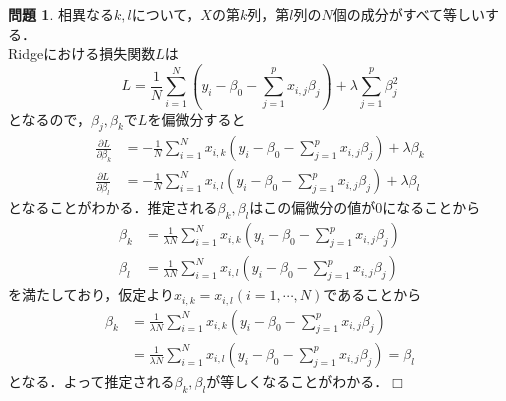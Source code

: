 \documentclass[titlepage]{jsarticle}
\theoremstyle{definition}
\newtheorem{Ex}{問題}
\theoremstyle{mystyle} %
\def\qed{\hfill$\Box$}
\begin{document}
\begin{Ex}
相異なる$k,l$について，$X$の第$k$列，第$l$列の$N$個の成分がすべて等しいする．\\
Ridgeにおける損失関数$L$は
$$L=\frac{1}{N}\sum_{i=1}^N(y_i-\beta_0-\sum_{j=1}^px_{i,j}\beta_j)+\lambda\sum_{j=1}^p \beta_j^2$$
となるので，$\beta_j,\beta_k$で$L$を偏微分すると
\begin{align*}
\frac{\partial L}{\partial \beta_k}&=-\frac{1}{N}\sum_{i=1}^Nx_{i,k}(y_i-\beta_0-\sum_{j=1}^px_{i,j}\beta_j)+\lambda \beta_k\\
\frac{\partial L}{\partial \beta_l}&=-\frac{1}{N}\sum_{i=1}^Nx_{i,l}(y_i-\beta_0-\sum_{j=1}^px_{i,j}\beta_j)+\lambda \beta_l
\end{align*}
となることがわかる．推定される$\beta_k,\beta_l$はこの偏微分の値が$0$になることから
\begin{align*}
\beta_k&=\frac{1}{\lambda N}\sum_{i=1}^Nx_{i,k}(y_i-\beta_0-\sum_{j=1}^px_{i,j}\beta_j)\\
\beta_l&=\frac{1}{\lambda N}\sum_{i=1}^Nx_{i,l}(y_i-\beta_0-\sum_{j=1}^px_{i,j}\beta_j)
\end{align*}
を満たしており，仮定より$x_{i,k}=x_{i,l}(i=1,\cdots,N)$であることから
\begin{align*}
\beta_k&=\frac{1}{\lambda N}\sum_{i=1}^Nx_{i,k}(y_i-\beta_0-\sum_{j=1}^px_{i,j}\beta_j)\\
&=\frac{1}{\lambda N}\sum_{i=1}^Nx_{i,l}(y_i-\beta_0-\sum_{j=1}^px_{i,j}\beta_j)=\beta_l
\end{align*}
となる．よって推定される$\beta_k,\beta_l$が等しくなることがわかる．\qed\\
\end{Ex}
\end{document}
